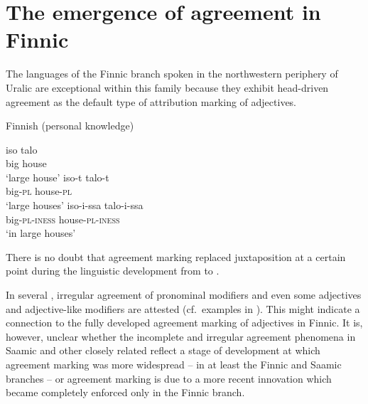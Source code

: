 {\section[Agreement in Finnic]{The emergence of agreement in Finnic} \label{Finnic diachr}
The languages of the Finnic branch spoken in the northwestern periphery of Uralic are exceptional within this family because they exhibit head\hyp{}driven agreement as the default type of attribution marking of adjectives.
\begin{exe}
\ex \rm{Finnish (personal knowledge)}
\begin{xlist}
\ex
\gll	iso talo\\
	big house\\
\glt	‘large house’
\ex	
\gll	iso-t talo-t\\
	big-\textsc{pl} house-\textsc{pl}\\
\glt	‘large houses’
\ex	
\gll	iso-i-ssa	talo-i-ssa\\
	big-\textsc{pl}-\textsc{iness} house-\textsc{pl}-\textsc{iness}\\
\glt	‘in large houses’
\end{xlist}
\end{exe}
There is no doubt that agreement marking replaced juxtaposition at a certain point during the linguistic development from  to .

In several , irregular agreement of pronominal modifiers and even some adjectives and adjective-like modifiers are attested (cf.~examples in \citealt{honti1997}). This might indicate a connection to the fully developed agreement marking of adjectives in Finnic. It is, however, unclear whether the incomplete and irregular agreement phenomena in Saamic and other closely related  reflect a stage of development at which agreement marking was more widespread – in at least the Finnic and Saamic branches – or agreement marking is due to a more recent innovation which became completely enforced only in the Finnic branch. 

}
